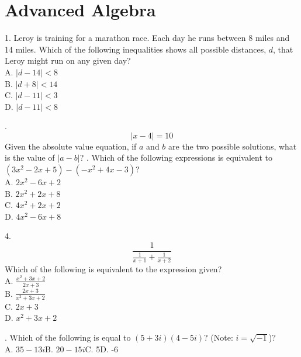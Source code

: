 \documentclass[../satmath.tex]{subfiles}
\begin{document}
\chapter{Advanced Algebra}
1. Leroy is training for a marathon race. Each day he runs between 8 miles and 14 miles. Which of the following inequalities shows all possible 
distances, $d$, that Leroy might run on any given day?\\
A. $|d-14|<8$\\
B. $|d+8|<14$\\
C. $|d-11|<3$\\
D. $|d-11|<8$

. 
\[|x-4|=10\]
Given the absolute value equation, if $a$ and $b$ are the two possible solutions, what is the value of $|a-b|$?
. Which of the following expressions is equivalent to $(3x^2-2x+5)-(-x^2+4x-3)$?\\
A. $2x^2-6x+2$\\
B. $2x^2+2x+8$\\
C. $4x^2+2x+2$\\
D. $4x^2-6x+8$
\medbreak 

4.
\[\frac{1}{\frac{1}{x+1}+\frac{1}{x+2}}\]
Which of the following is equivalent to the expression given?\\
A. $\frac{x^2+3x+2}{2x+3}$\\
B. $\frac{2x+3}{x^2+3x+2}$\\
C. $2x+3$\\
D. $x^2+3x+2$

. Which of the following is equal to $(5+3i)(4-5i)$? (Note: $i=\sqrt{-1}$)?\\
A. $35-13i$\quad B. $20-15i$\quad C. 5\quad D. -6
\medbreak 
\end{document}
